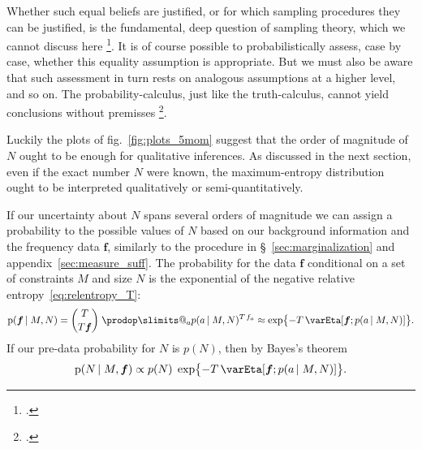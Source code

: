 \documentclass[\ifafour a4paper,12pt,\else a5paper,10pt,\fi%
onecolumn,oneside,article,%
british%
]{memoir}
\makeatletter
\theoremstyle{remark}
\theoremstyle{innote}
\def\prod{\DOTSI\prodop\slimits@}
\newcommand*{\citep}{\footcites}
\newcommand*{\pf}{\mathrm{p}}%
\renewcommand*{\|}{\nonscript\,\vert\nonscript\;\mathopen{}}
\newcommand*{\sect}{\S}%
\newcommand*{\fig}{fig.}%
\newcommand*{\eg}{{e.g.}}
\newcommand*{\yav}{a}
\newcommand*{\yff}{f}
\newcommand*{\yf}{\bm{\yff}}
\newcommand*{\ya}{\yav}%
\newcommand*{\pxx}{p}
\newcommand*{\sh}{\mathrm{\varEta}}
\makeatother
\begin{document}
Whether such equal beliefs are justified, or for which sampling procedures
they can be justified, is the fundamental, deep question of sampling
theory, which we cannot discuss here \citep[see \eg\ the discussions and
references
in][]{ericson1969,smith1976}. %
It is of course possible to probabilistically assess, case by case, whether
this equality assumption is appropriate. But we must also be aware that
such assessment in turn rests on analogous assumptions at a higher level,
and so on. The probability-calculus, just like the truth-calculus, cannot
yield conclusions without premisses \citep{hailperin2011}[p.~182]{johnson1924}.

Luckily the plots of \fig~\ref{fig:plots_5mom} suggest that the order of
magnitude of $N$ ought to be enough for qualitative inferences. As
discussed in the next section, even if the exact number $N$ were known, the
maximum-entropy distribution ought to be interpreted qualitatively or
semi-quantitatively.

\medskip

If our uncertainty about $N$ spans several orders of magnitude we can
assign a probability to the possible values of $N$ based on our background
information and the frequency data $\yf$, similarly to the procedure in
\sect~\ref{sec:marginalization} and appendix~\ref{sec:measure_suff}. The
probability for the data $\yf$ conditional on a set of constraints $M$ and
size $N$ is the exponential of the negative relative
entropy~\eqref{eq:relentropy_T}:
\begin{equation}
  \label{eq:prob_data_from_N}
  \pf(\yf \| M, N) = \binom{T}{T\yf}\;\prod_{a}\pxx(\ya \| M, N)^{T\,\yff_{a}}
  \approx \exp\bigl\{  -T\,\sh[\yf; \pxx(\ya \| M, N)]\bigr\}.
\end{equation}
If our pre-data probability for $N$ is $p(N)$, then by Bayes's theorem
\begin{equation}
  \label{eq:prob_N_from_data}
  \pf(N \| M, \yf) \propto
  p(N)\;\exp\bigl\{-T\,\sh[\yf; \pxx(\ya \| M, N)]\bigr\}.
\end{equation}
\end{document}
